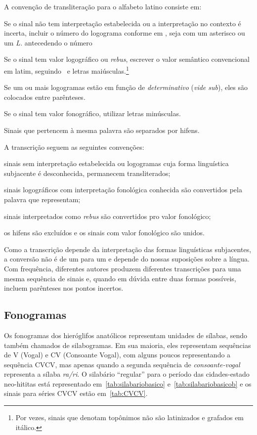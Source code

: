\noindent A convenção de transliteração para o alfabeto latino consiste em:
\noprelistbreak%
\begin{compactenum}
	\item Se o sinal não tem interpretação estabelecida ou a interpretação no
	contexto é incerta, incluir o número do logograma conforme em
	\citet{LarocheHH}, seja com um asterisco ou um \emph{L.} antecedendo o
	número
	\item Se o sinal tem valor logográfico ou \emph{rebus},
	escrever o valor semântico convencional em latim,
	seguindo~\citet{LarocheHH} e letras maiúsculas.\footnote{Por vezes,
		sinais que denotam topônimos não são latinizados e grafados em itálico.}
	\item Se um ou mais logogramas estão em função de \emph{determinativo}
	(\emph{vide sub}), eles são colocados entre parênteses.
	\item Se o sinal tem valor fonográfico, utilizar letras minúsculas.
	\item Sinais que pertencem à mesma palavra são separados por hifens.
\end{compactenum}
A transcrição seguem as seguintes convenções:
\begin{compactenum}
	\item sinais sem interpretação estabelecida ou logogramas cuja forma linguística
	subjacente é desconhecida, permanecem transliterados;
	\item sinais logográficos com interpretação fonológica conhecida são convertidos pela
	palavra que representam;
	\item sinais interpretados como \emph{rebus} são convertidos pro valor
	fonológico;
	\item os hifens são excluídos e os sinais com valor fonológico são unidos.
\end{compactenum}
Como a transcrição depende da interpretação das formas linguísticas subjacentes,
a conversão não é de um para um e depende do nossas suposições sobre a língua.
Com frequência, diferentes autores produzem diferentes transcrições para uma mesma
sequência de sinais e, quando em dúvida entre duas formas possíveis, incluem
parênteses nos pontos incertos.

\subsection{Fonogramas}

Os fonogramas dos hieróglifos anatólicos representam unidades de sílabas, sendo
também chamados de silabogramas.
Em sua maioria, eles representam sequências de V (Vogal) e CV (Consoante Vogal),
com alguns poucos representando a sequência CVCV, mas apenas quando a segunda
sequência de \emph{consoante\hyp{}vogal} representa a sílaba \emph{ra\slash{}ri}.\@
O silabário ``regular'' para o período das cidades-estado neo-hititas está
representado em~\autoref{tab:silabariobasico} e~\autoref{tab:silabariobasicob} e
os sinais para séries CVCV estão em~\autoref{tab:CVCV}.

